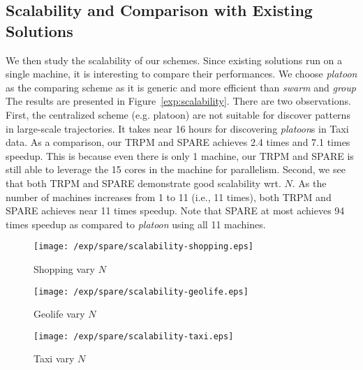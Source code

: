 \subsection{Scalability and Comparison with Existing Solutions}
We then study the scalability of our schemes.
Since existing solutions run on a single machine, it is interesting to compare their
performances. We choose \emph{platoon} as the comparing scheme as it is
generic and more efficient than \emph{swarm} and \emph{group}
The results are presented in Figure~\ref{exp:scalability}. There are two observations.
First, the centralized scheme (e.g. platoon) are not suitable for discover
patterns in large-scale trajectories. It takes near 16 hours for discovering \emph{platoon}s
in Taxi data. As a comparison, our TRPM and SPARE achieves 2.4 times and 7.1 times speedup.
This is because even there is only 1 machine, our TRPM and SPARE is still able to leverage
the 15 cores in the machine for parallelism. Second, we see that both TRPM and SPARE
demonstrate good scalability wrt. $N$. As the number of machines increases from 1 to 11 (i.e., 11 times),
both TRPM and SPARE achieves near 11 times speedup. Note that SPARE at most achieves 94 times
speedup as compared to \emph{platoon} using all 11 machines.

\begin{figure*}[t]
\centering
\begin{subfigure}[b]{0.32\textwidth}
    \texttt{[image: /exp/spare/scalability-shopping.eps]}
        \caption{Shopping vary $N$}
    \end{subfigure}
 	 \begin{subfigure}[b]{0.32\textwidth}
        \texttt{[image: /exp/spare/scalability-geolife.eps]}
        \caption{Geolife vary $N$}
    \end{subfigure}
    	 \begin{subfigure}[b]{0.32\textwidth}
        \texttt{[image: /exp/spare/scalability-taxi.eps]}
        \caption{Taxi vary $N$}
    \end{subfigure}
 \caption{Scalability of SPARE and TRPM wrt. $N$}
 \label{exp:scalability}
\end{figure*}